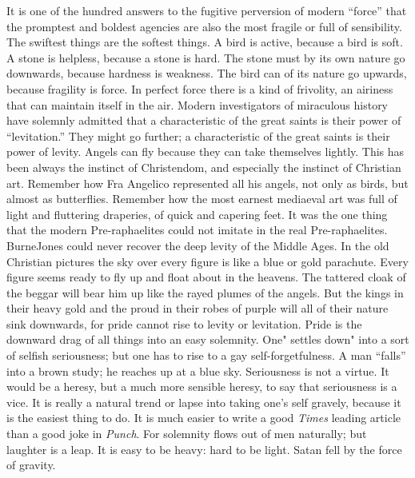 \documentclass{book}
\begin{document}
It is one of the hundred answers to the fugitive perversion of modern “force” that the promptest and boldest agencies are also the most fragile or full of sensibility. The swiftest things are the softest things. A bird is active, because a bird is soft. A stone is helpless, because a stone is hard. The stone must by its own nature go downwards, because hardness is weakness. The bird can of its nature go upwards, because fragility is force. In perfect force there is a kind of frivolity, an airiness that can maintain itself in the air. Modern investigators of miraculous history have solemnly admitted that a characteristic of the great saints is their power of “levitation.” They might go further; a characteristic of the great saints is their power of levity. Angels can fly because they can take themselves lightly. This has been always the instinct of Christendom, and especially the instinct of Christian art. Remember how Fra Angelico represented all his angels, not only as birds, but almost as butterflies. Remember how the most earnest mediaeval art was full of light and fluttering draperies, of quick and capering feet. It was the one thing that the modern Pre-raphaelites could not imitate in the real Pre-raphaelites. BurneJones could never recover the deep levity of the Middle Ages. In the old Christian pictures the sky over every figure is like a blue or gold parachute. Every figure seems ready to fly up and float about in the heavens. The tattered cloak of the beggar will bear him up like the rayed plumes of the angels. But the kings in their heavy gold and the proud in their robes of purple will all of their nature sink downwards, for pride cannot rise to levity or levitation. Pride is the downward drag of all things into an easy solemnity. One" settles down" into a sort of selfish seriousness; but one has to rise to a gay self-forgetfulness. A man “falls” into a brown study; he reaches up at a blue sky. Seriousness is not a virtue. It would be a heresy, but a much more sensible heresy, to say that seriousness is a vice. It is really a natural trend or lapse into taking one’s self gravely, because it is the easiest thing to do. It is much easier to write a good \emph{Times} leading article than a good joke in \emph{Punch}. For solemnity flows out of men naturally; but laughter is a leap. It is easy to be heavy: hard to be light. Satan fell by the force of gravity.
\end{document}
